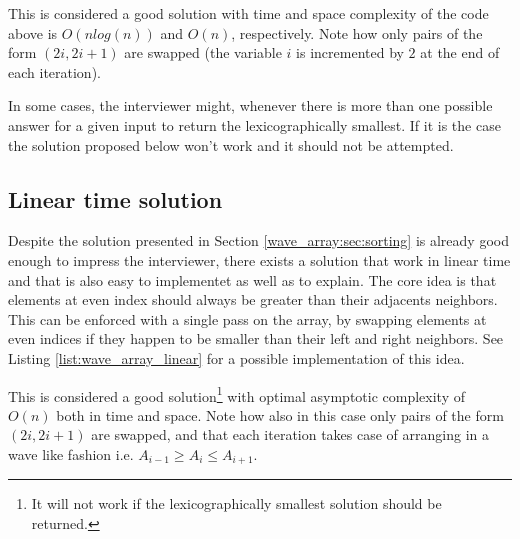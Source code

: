 

This is considered a good solution with time and space complexity of the code above is $O(nlog(n))$ and $O(n)$, respectively.
Note how only pairs of the form $(2i, 2i+1)$ are swapped (the variable $i$ is incremented by $2$ at the end of each iteration).

In some cases, the interviewer might, whenever there is more than one possible answer for a given input to return the lexicographically smallest. If it is the case the solution proposed below won't work and it should not be attempted.

\subsection{Linear time solution}
Despite the solution presented in Section \ref{wave_array:sec:sorting} is already good enough to impress the interviewer, there exists a solution that work in linear time and that is also easy to implementet as well as to explain. The core idea is that  elements at even index should always be greater than their adjacents neighbors. This can be enforced with a single pass on the array, by swapping elements at even indices if they happen to be smaller than their left and right neighbors. See Listing \ref{list:wave_array_linear} for a possible implementation of this idea.



This is considered a good solution\footnote{It will not work if the lexicographically smallest solution should be returned.} with optimal asymptotic complexity of $O(n)$ both in time and space.
Note how also in this case only pairs of the form $(2i, 2i+1)$ are swapped, and that each iteration takes case of arranging in a wave like fashion i.e. $A_{i-1} \geq A_i \leq A_{i+1}$.
